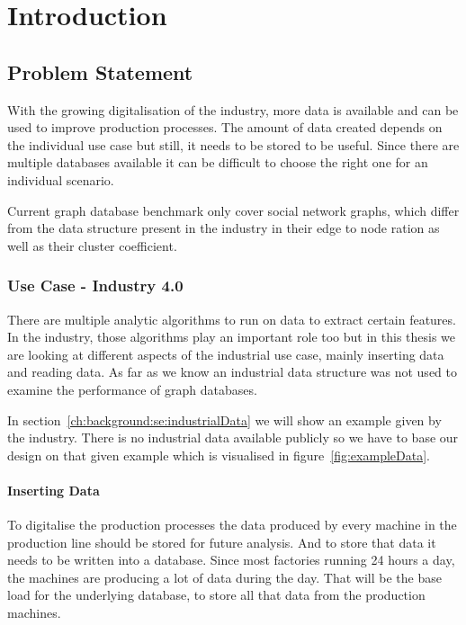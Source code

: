 \chapter{Introduction}
\label{ch:introduction}

\section{Problem Statement}
With the growing digitalisation of the industry,
more data is available and can be used to improve production processes.
The amount of data created depends on the individual use case but still,
it needs to be stored to be useful.
Since there are multiple databases available it can be difficult to choose the right one for an individual scenario.

Current graph database benchmark only cover social network graphs,
which differ from the data structure present in the industry in their edge to node ration as well as their cluster coefficient.

\subsection{Use Case - Industry 4.0}
There are multiple analytic algorithms to run on data to extract certain features.
In the industry,
those algorithms play an important role too but in this thesis we are looking at different aspects of the industrial use case,
mainly inserting data and reading data.
As far as we know an industrial data structure was not used to examine the performance of graph databases.

In section~\ref{ch:background:se:industrialData} we will show an example given by the industry.
There is no industrial data available publicly so we have to base our design on that given example which is visualised in figure~\ref{fig:exampleData}.

\subsubsection{Inserting Data}
To digitalise the production processes the data produced by every machine in the production line should be stored for future analysis.
And to store that data it needs to be written into a database.
Since most factories running 24 hours a day,
the machines are producing a lot of data during the day.
That will be the base load for the underlying database, to store all that data from the production machines.


